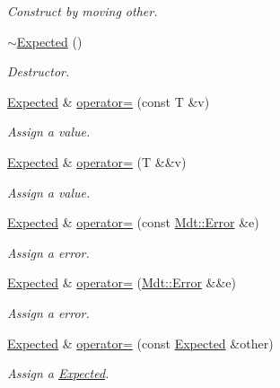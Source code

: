 \begin{DoxyCompactItemize}
\begin{DoxyCompactList}\small\item\em Construct by moving other. \end{DoxyCompactList}\item 
\hyperlink{class_mdt_1_1_expected_ab3694955007f559c7f394e9883aa44a0}{$\sim$\+Expected} ()
\begin{DoxyCompactList}\small\item\em Destructor. \end{DoxyCompactList}\item 
\hyperlink{class_mdt_1_1_expected}{Expected} \& \hyperlink{class_mdt_1_1_expected_a9c7eb862d4d49f2160a16e32ec302e6c}{operator=} (const T \&v)
\begin{DoxyCompactList}\small\item\em Assign a value. \end{DoxyCompactList}\item 
\hyperlink{class_mdt_1_1_expected}{Expected} \& \hyperlink{class_mdt_1_1_expected_a7c1272621b28c6750f4a230278d477da}{operator=} (T \&\&v)
\begin{DoxyCompactList}\small\item\em Assign a value. \end{DoxyCompactList}\item 
\hyperlink{class_mdt_1_1_expected}{Expected} \& \hyperlink{class_mdt_1_1_expected_a60b7b4811399f71568fda6731a7afd59}{operator=} (const \hyperlink{class_mdt_1_1_error}{Mdt\+::\+Error} \&e)
\begin{DoxyCompactList}\small\item\em Assign a error. \end{DoxyCompactList}\item 
\hyperlink{class_mdt_1_1_expected}{Expected} \& \hyperlink{class_mdt_1_1_expected_a97c105de76860ec6fa9ce7926d6bc6a4}{operator=} (\hyperlink{class_mdt_1_1_error}{Mdt\+::\+Error} \&\&e)
\begin{DoxyCompactList}\small\item\em Assign a error. \end{DoxyCompactList}\item 
\hyperlink{class_mdt_1_1_expected}{Expected} \& \hyperlink{class_mdt_1_1_expected_a95886cd2913a38e147186ed3d9e72a7c}{operator=} (const \hyperlink{class_mdt_1_1_expected}{Expected} \&other)
\begin{DoxyCompactList}\small\item\em Assign a \hyperlink{class_mdt_1_1_expected}{Expected}. \end{DoxyCompactList}\item 

\end{DoxyCompactItemize}
